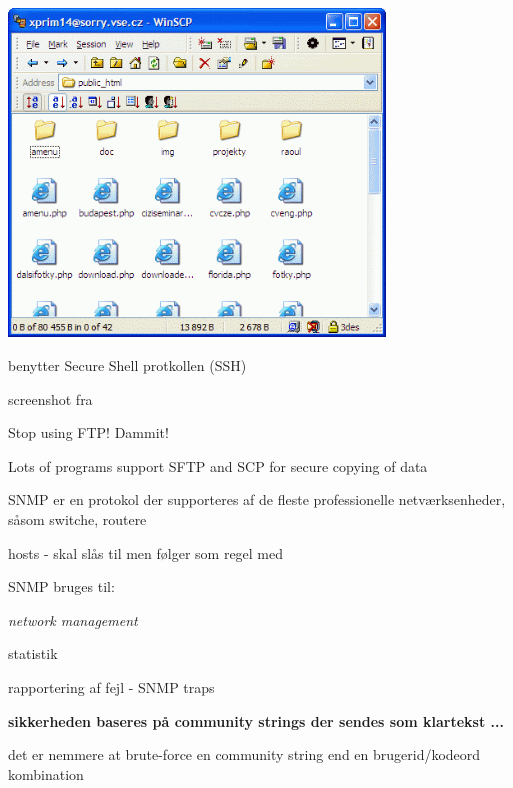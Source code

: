 \documentclass[20pt,landscape,a4paper,footrule]{foils}
\begin{document}

\begin{center}
\colorbox{white}{\includegraphics[width=10cm]{images/winscp-explorer.png}}  
\end{center}

\begin{center}
\item benytter Secure Shell protkollen (SSH) 
\item screenshot fra
\end{center}




\begin{list1}
\item Stop using FTP! Dammit!
\item Lots of programs support SFTP and SCP for secure copying of data
\item {}
\end{list1}





\begin{list1}
\item SNMP er en protokol der supporteres af de fleste professionelle
  netværksenheder, såsom switche, routere
\item hosts - skal slås til men følger som regel med
\item SNMP bruges til: 
  \begin{list2}
    \item \emph{network management}
    \item statistik
    \item rapportering af fejl - SNMP traps
  \end{list2}
\item {\bfseries sikkerheden baseres på community strings der sendes
    som klartekst ...}
\item det er nemmere at brute-force en community string end en
  brugerid/kodeord kombination
\end{list1}
\end{document}
